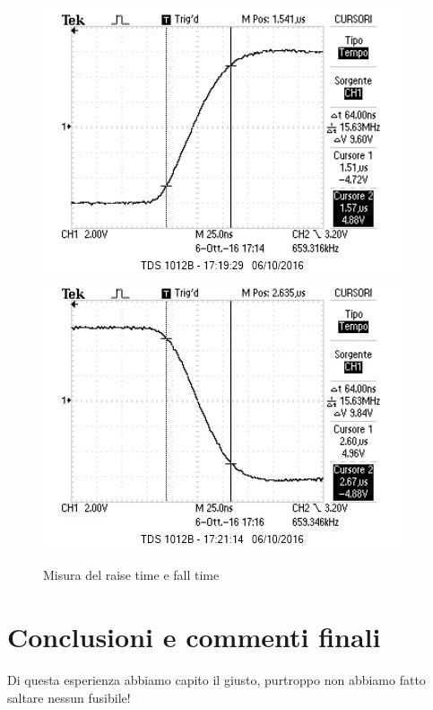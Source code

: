 \documentclass[10pt,a4paper]{article}
\begin{document}
\begin{figure}[h]
	\centering
	\includegraphics[scale=0.6]{../Oscilloscopio/raise_time.jpg}
	\includegraphics[scale=0.6]{../Oscilloscopio/fall_time.jpg}
	\caption{Misura del raise time e fall time}
	\label{f:raise}
\end{figure}

\section{Conclusioni e commenti finali}
Di questa esperienza abbiamo capito il giusto, purtroppo non abbiamo fatto saltare nessun fusibile!
\end{document}

